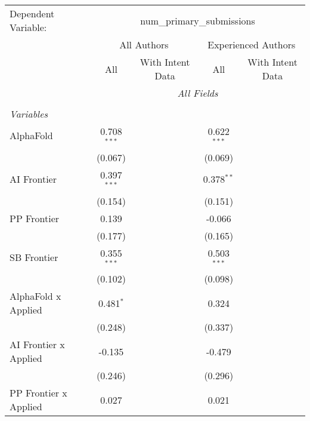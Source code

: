 \begingroup
\centering
\begin{tabular}{lcccccc}
   \tabularnewline \midrule \midrule
   Dependent Variable: & \multicolumn{6}{c}{num\_primary\_submissions}\\
 & \multicolumn{3}{c}{All Authors} & \multicolumn{3}{c}{Experienced Authors} \\
\cmidrule(lr){2-4} \cmidrule(lr){5-7}
 & \multicolumn{1}{c}{All} & \multicolumn{2}{c}{With Intent Data} & \multicolumn{1}{c}{All} & \multicolumn{2}{c}{With Intent Data} \\
\cmidrule(lr){2-2} \cmidrule(lr){3-4} \cmidrule(lr){5-5} \cmidrule(lr){6-7}
 & \multicolumn{6}{c}{\textit{All Fields}} \\ \\
   \emph{Variables}\\
   AlphaFold             & 0.708$^{***}$ &         &         & 0.622$^{***}$ &         &   \\   
                         & (0.067)       &         &         & (0.069)       &         &   \\   
   AI Frontier           & 0.397$^{***}$ &         &         & 0.378$^{**}$  &         &   \\   
                         & (0.154)       &         &         & (0.151)       &         &   \\   
   PP Frontier           & 0.139         &         &         & -0.066        &         &   \\   
                         & (0.177)       &         &         & (0.165)       &         &   \\   
   SB Frontier           & 0.355$^{***}$ &         &         & 0.503$^{***}$ &         &   \\   
                         & (0.102)       &         &         & (0.098)       &         &   \\   
   AlphaFold x Applied   & 0.481$^{*}$   &         &         & 0.324         &         &   \\   
                         & (0.248)       &         &         & (0.337)       &         &   \\   
   AI Frontier x Applied & -0.135        &         &         & -0.479        &         &   \\   
                         & (0.246)       &         &         & (0.296)       &         &   \\   
   PP Frontier x Applied & 0.027         &         &         & 0.021         &         &   \\   

\end{tabular}
